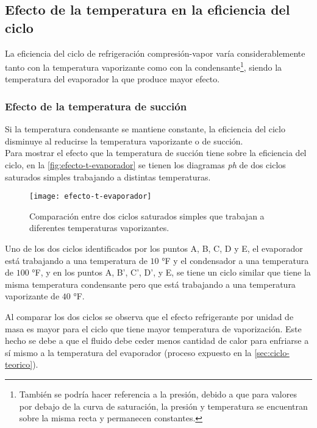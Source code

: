 	
	\subsection{Efecto de la temperatura en la eficiencia del ciclo}
	
		La eficiencia del ciclo de refrigeración compresión-vapor varía considerablemente tanto con la temperatura vaporizante como con la condensante\footnote{También se podría hacer referencia a la presión, debido a que para valores por debajo de la curva de saturación, la presión y temperatura se encuentran sobre la misma recta y permanecen constantes.}, siendo la temperatura del evaporador la que produce mayor efecto.
		
		\subsubsection{Efecto de la temperatura de succión}
		
		Si la temperatura condensante se mantiene constante, la eficiencia del ciclo disminuye al reducirse la temperatura vaporizante o de succión.\\
		
		
		Para mostrar el efecto que la temperatura de succión tiene sobre la eficiencia del ciclo, en la \autoref{fig:efecto-t-evaporador} se tienen los diagramas \emph{ph} de dos ciclos saturados simples trabajando a distintas temperaturas.
		
		\begin{figure}[h]
			\centering
			\texttt{[image: efecto-t-evaporador]}
			\caption{Comparación entre dos ciclos saturados simples que trabajan a diferentes temperaturas vaporizantes.}
			\label{fig:efecto-t-evaporador}
		\end{figure}
		
		Uno de los dos ciclos identificados por los puntos A, B, C, D y E, el evaporador está trabajando a una temperatura de $10$ °F y el condensador a una temperatura de $100$ °F, y en los puntos A, B', C', D', y E, se tiene un ciclo similar que tiene la misma temperatura condensante pero que está trabajando a una temperatura vaporizante de $40$ °F.
		
		Al comparar los dos ciclos se observa que el efecto refrigerante por unidad de masa es mayor para el ciclo que tiene mayor temperatura de vaporización. Este hecho se debe a que el fluido debe ceder menos cantidad de calor para enfriarse a sí mismo a la temperatura del evaporador (proceso expuesto en la  \autoref{sec:ciclo-teorico}). \\
		
